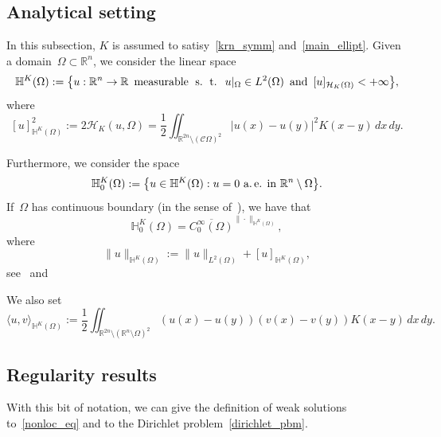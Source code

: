 \documentclass[10pt,a4paper]{amsart}
\numberwithin{equation}{section}
\newcommand{\Rn}{\mathbb{R}^n}
\newcommand{\R}{\mathbb{R}}
\newcommand{\snr}[1]{\lvert #1\rvert}
\newcommand{\Hc}{\mathcal{H}_K}
\newcommand{\Hbb}{\mathbb{H}^K}
\begin{document}
    \subsection{Analytical setting}\label{secanalytfra00}
     
In this subsection, $K$ is assumed to satisy~\eqref{krn_symm} and~\eqref{main_ellipt}. Given a domain~$\Omega \subset \Rn$, we consider the linear space
    $$
    \Hbb(\Omega) := \big\{u : \Rn \to \R \, \mbox{ measurable} \;{\mbox{ s. ~\!t. }}\; u|_{\Omega} \in L^2(\Omega) \, \mbox{ and }  \, [u]_{\Hc(\Omega)} < +\infty\big\},
    $$
    where 
     \begin{equation}\label{resis}
    [u]^2_{\Hbb(\Omega)}:=2 \Hc(u,\Omega) = \frac{1}{2}\iint_{\R^{2n}\setminus(\mathscr{C}\Omega)^2}\snr{u(x)-u(y)}^2 {K}(x-y) \, dx \, dy.
\end{equation}

Furthermore, we consider the space
    $$
    \Hbb_0 (\Omega) := \big\{u \in \Hbb(\Omega): u =0 \  \mbox{a.~\!e. in} \  \Rn \setminus \Omega\big\}.
    $$
If~$\Omega$ has continuous boundary (in the sense of~\cite[Definition~4]{fiscella}),
    we have that
    \begin{equation}\label{hfuroieytuhgvkus549860}
    \Hbb_0(\Omega) = \overline{C^\infty_0(\Omega)}^{\|\cdot\|_{\Hbb(\Omega)}},
    \end{equation}
    where
$$ \|u\|_{\Hbb(\Omega)}:=\|u\|_{L^2(\Omega)} + [u]_{\Hbb(\Omega)},$$
see~\cite[Remark~3.1]{CP16} and~\cite[Theorem~6]{fiscella}

We also set
    \begin{equation*}
    \langle u,v \rangle_{\Hbb(\Omega)}:= \frac{1}{2}\iint_{\R^{2n} \setminus (\R^n \setminus \Omega)^2} (u(x)-u(y))(v(x)-v(y)) {K}(x-y) \, dx \, dy.
    \end{equation*} 
    
\subsection{Regularity results}

    With this bit of notation, we can give the definition of weak solutions to~\eqref{nonloc_eq} and to the Dirichlet problem~\eqref{dirichlet_pbm}.
\end{document}
